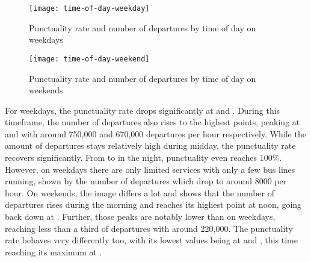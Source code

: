 \begin{figure}[h]
	\centering
	\texttt{[image: time-of-day-weekday]}
	\caption{Punctuality rate and number of departures by time of day on weekdays}
	\label{fig:time-of-day-weekday}
\end{figure}

\begin{figure}[h]
	\centering
	\texttt{[image: time-of-day-weekend]}
	\caption{Punctuality rate and number of departures by time of day on weekends}
	\label{fig:time-of-day-weekend}
\end{figure}

For weekdays, the punctuality rate drops significantly at  and . During this timeframe, the number of departures also rises to the highest points, peaking at  and  with around 750,000 and 670,000 departures per hour respectively. While the amount of departures stays relatively high during midday, the punctuality rate recovers significantly. From  to  in the night, punctuality even reaches 100\%. However, on weekdays there are only limited services with only a few bus lines running, shown by the number of departures which drop to around 8000 per hour. On weekends, the image differs a lot and shows that the number of departures rises during the morning and reaches its highest point at noon, going back down at . Further, those peaks are notably lower than on weekdays, reaching less than a third of departures with around 220,000. The punctuality rate behaves very differently too, with its lowest values being at  and , this time reaching its maximum at .